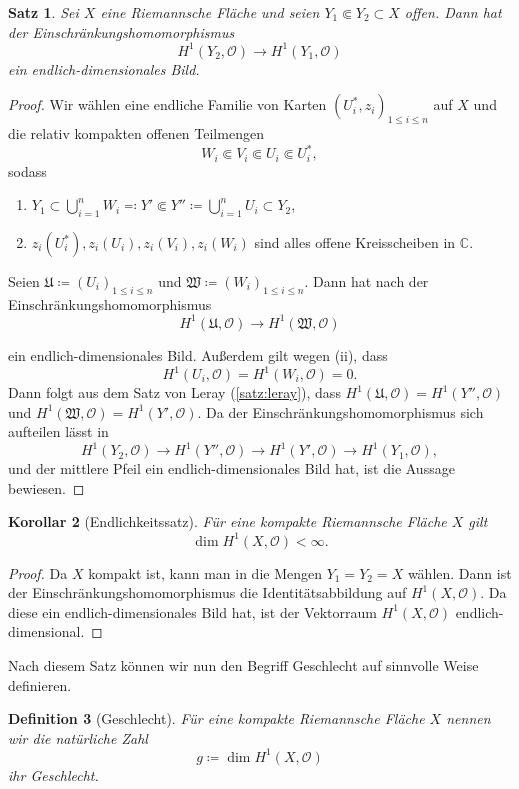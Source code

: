 \documentclass[11pt,a4paper,toc=bibliography]{scrartcl}
\theoremstyle{def}
\newtheorem{defi}{Definition}[section]
\theoremstyle{thm}
\newtheorem{satz}[defi]{Satz}
\newtheorem{koro}[defi]{Korollar}
\theoremstyle{remark}
\begin{document}
\begin{satz}
Sei $X$ eine Riemannsche Fläche und seien $Y_1\Subset Y_2\subset X$ offen. Dann hat der Einschränkungshomomorphismus
\[
H^1(Y_2,\mathcal{O})\rightarrow H^1(Y_1,\mathcal{O})
\]
ein endlich-dimensionales Bild.
\end{satz}
\begin{proof}
Wir wählen eine endliche Familie von Karten $(U_i^*,z_i)_{1\leq i\leq n}$ auf $X$ und die relativ kompakten offenen Teilmengen
\[
W_i\Subset V_i\Subset U_i\Subset U_i^*,
\] 
sodass 
\begin{enumerate}
\item $Y_1\subset \bigcup_{i=1}^n W_i \eqqcolon Y'\Subset Y''\coloneqq \bigcup_{i=1}^n U_i\subset Y_2$,
\item $z_i(U_i^*),z_i(U_i),z_i(V_i),z_i(W_i)$ sind alles offene Kreisscheiben in $\mathbb{C}$.
\end{enumerate}
Seien $\mathfrak{U}\coloneqq (U_i)_{1\leq i\leq n}$ und $\mathfrak{W}\coloneqq (W_i)_{1\leq i\leq n}$. Dann hat nach  der Einschränkungshomomorphismus
\[
H^1(\mathfrak{U},\mathcal{O})\rightarrow H^1(\mathfrak{W},\mathcal{O})
\]

ein endlich-dimensionales Bild. Außerdem gilt wegen  (ii), dass \[H^1(U_i,\mathcal{O})=H^1(W_i,\mathcal{O})=0.\] 
Dann folgt aus dem Satz von Leray (\ref{satz:leray}), dass $H^1(\mathfrak{U},\mathcal{O})=H^1(Y'',\mathcal{O})$ und $H^1(\mathfrak{W},\mathcal{O})=H^1(Y',\mathcal{O})$. Da der Einschränkungshomomorphismus sich aufteilen lässt in 
\[
H^1(Y_2,\mathcal{O})\rightarrow H^1(Y'',\mathcal{O})\rightarrow H^1(Y',\mathcal{O})\rightarrow H^1(Y_1,\mathcal{O}),
\]
 und der mittlere Pfeil ein endlich-dimensionales Bild hat, ist die Aussage bewiesen.
\end{proof}
\begin{koro}[Endlichkeitssatz]
Für eine kompakte Riemannsche Fläche $X$ gilt 
\[
\dim H^1(X,\mathcal{O})<\infty.
\]
\end{koro}
\begin{proof}
Da $X$ kompakt ist, kann man in  die Mengen $Y_1=Y_2=X$ wählen. Dann ist der Einschränkungshomomorphismus die Identitätsabbildung auf $H^1(X,\mathcal{O})$. Da diese ein endlich-dimensionales Bild hat, ist der Vektorraum $H^1(X,\mathcal{O})$ endlich-dimensional.
\end{proof}
Nach diesem Satz können wir nun den Begriff Geschlecht auf sinnvolle Weise definieren.
\begin{defi}[Geschlecht]
	Für eine kompakte Riemannsche Fläche $X$ nennen wir die  natürliche Zahl
	 \[
	 g\coloneqq  \dim H^1(X,\mathcal{O})
	\]
	ihr \emph{Geschlecht}.
\end{defi}
\end{document}
